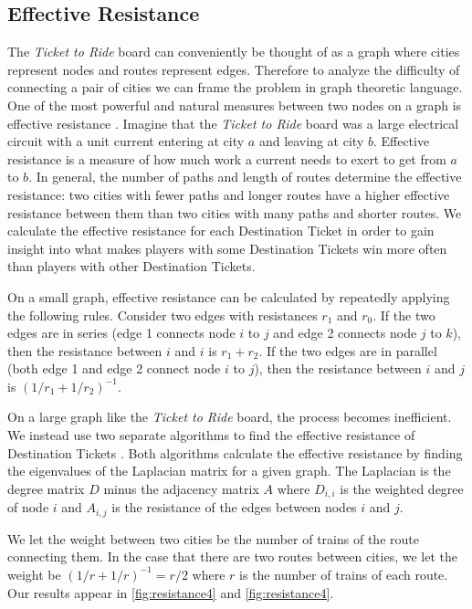 \begin{multicols}{2}
\subsection{Effective Resistance}
The \textit{Ticket to Ride} board can conveniently
be thought of as a graph where cities represent
nodes and routes represent edges.
Therefore to analyze the difficulty of connecting a
pair of cities we can frame the problem in graph theoretic language.
One of the most powerful and natural measures
between two nodes on a graph is effective resistance
\cite{ellens2011effective}.
Imagine that the \textit{Ticket to Ride} board was
a large electrical circuit with a unit current
entering at city $a$ and leaving at city $b$.
Effective resistance is a measure
of how much work a current needs to exert
to get from $a$ to $b$.
In general, the number of paths and length of routes 
determine the effective resistance:
two cities with fewer paths and longer routes
have a higher effective resistance between them
than two cities with many paths and shorter routes.
We calculate the effective resistance for each 
Destination Ticket in order to gain insight
into what makes players with some Destination Tickets
win more often than players with other Destination Tickets.

On a small graph, effective resistance can be calculated
by repeatedly applying the following rules.
Consider two edges with resistances $r_1$ and $r_0$.
If the two edges are in series (edge 1 connects node $i$ to $j$
and edge 2 connects node $j$ to $k$), then the resistance between
$i$ and $i$ is $r_1 + r_2$.
If the two edges are in parallel (both edge 1 and edge 2 connect
node $i$ to $j$), then the resistance between $i$ and $j$
is $(1/r_1 + 1/r_2)^{-1}$.

On a large graph like the \textit{Ticket to Ride} board, 
the process becomes inefficient.
We instead use two separate algorithms to find the effective resistance
of Destination Tickets
\cite{ellens2011effective, wu2004theory}.
Both algorithms calculate the effective resistance by finding 
the eigenvalues of the Laplacian matrix for a given graph.
The Laplacian is the degree matrix $D$ minus the adjacency
matrix $A$ where $D_{i,i}$ is the weighted degree of node $i$
and $A_{i,j}$ is the resistance of the edges between nodes
$i$ and $j$.

We let the weight between two cities be the number
of trains of the route connecting them.
In the case that there are two routes between cities,
we let the weight be $(1/r + 1/r)^{-1}=r/2$ where
$r$ is the number of trains of each route.
Our results appear in \cref{fig:resistance4}
and \cref{fig:resistance4}.

\end{multicols}
